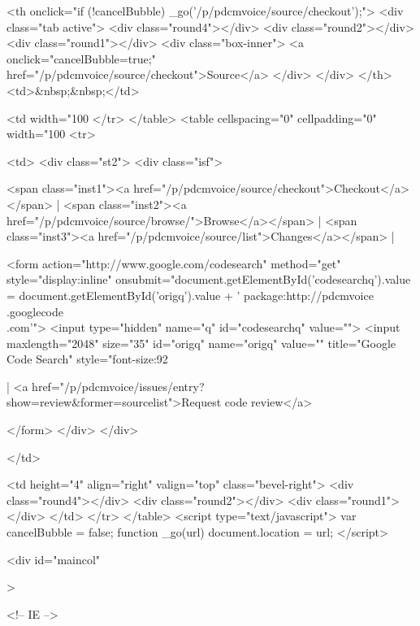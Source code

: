  
 
 
 
 <th onclick="if (!cancelBubble) _go('/p/pdcmvoice/source/checkout');">
 <div class="tab active">
 <div class="round4"></div>
 <div class="round2"></div>
 <div class="round1"></div>
 <div class="box-inner">
 <a onclick="cancelBubble=true;" href="/p/pdcmvoice/source/checkout">Source</a>
 </div>
 </div>
 </th><td>&nbsp;&nbsp;</td>
 
 
 <td width="100%
 </tr>
</table>
<table cellspacing="0" cellpadding="0" width="100%
 <tr>
 
 
 
 
 
 
 <td>
 <div class="st2">
 <div class="isf">
 
 
 
 <span class="inst1"><a href="/p/pdcmvoice/source/checkout">Checkout</a></span> |
 <span class="inst2"><a href="/p/pdcmvoice/source/browse/">Browse</a></span> |
 <span class="inst3"><a href="/p/pdcmvoice/source/list">Changes</a></span> |
 
 <form action="http://www.google.com/codesearch" method="get" style="display:inline"
 onsubmit="document.getElementById('codesearchq').value = document.getElementById('origq').value + ' package:http://pdcmvoice\\.googlecode\\.com'">
 <input type="hidden" name="q" id="codesearchq" value="">
 <input maxlength="2048" size="35" id="origq" name="origq" value="" title="Google Code Search" style="font-size:92%
 
  |
 <a href="/p/pdcmvoice/issues/entry?show=review&former=sourcelist">Request code review</a>
 
 
 </form>
 </div>
</div>

 </td>
 
 
 
 
 
 <td height="4" align="right" valign="top" class="bevel-right">
 <div class="round4"></div>
 <div class="round2"></div>
 <div class="round1"></div>
 </td>
 </tr>
</table>
<script type="text/javascript">
 var cancelBubble = false;
 function _go(url) { document.location = url; }
</script>


<div id="maincol"
 
>

 
<!-- IE -->



